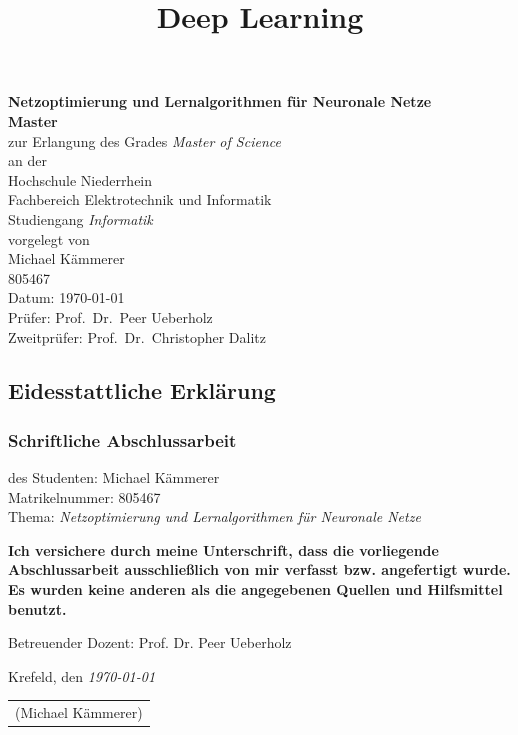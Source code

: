 \documentclass[12pt]{article}
\title{Deep Learning}
\begin{document}
	\begin{titlepage}
		\begin{center}
			{\Large\bf Netzoptimierung und Lernalgorithmen für Neuronale Netze}\\[2cm]

			{\bf Master}\\
			zur Erlangung des Grades {\em Master of Science}\\[1.5cm]

			an der\\
			Hochschule Niederrhein\\
			Fachbereich Elektrotechnik und Informatik\\
			Studiengang {\em Informatik}\\[3cm]

			vorgelegt von\\
			Michael Kämmerer\\
			805467 \\[3cm]
			Datum: \today\\[3cm]

			Prüfer: Prof.~Dr.~Peer Ueberholz\\
			Zweitprüfer: Prof.~Dr.~Christopher Dalitz
		\end{center}
	\end{titlepage}
	
	\begin{titlepage}

\section*{Eidesstattliche Erklärung}
\subsubsection*{Schriftliche Abschlussarbeit}

des Studenten: Michael Kämmerer\\
Matrikelnummer: 805467\\



Thema: {\em Netzoptimierung und Lernalgorithmen für Neuronale Netze} \newline

\textbf{Ich versichere durch meine Unterschrift, dass die vorliegende Abschlussarbeit 
 ausschließlich von mir verfasst bzw. angefertigt wurde. Es wurden keine anderen als die 
  angegebenen Quellen und Hilfsmittel benutzt.}

Betreuender Dozent:  Prof. Dr. Peer Ueberholz

Krefeld, den {\em \today}

\begin{tabular}{l}
\\
\\
\hline
(Michael Kämmerer)\\
\end{tabular}

\newpage
\end{titlepage}
\end{document}
